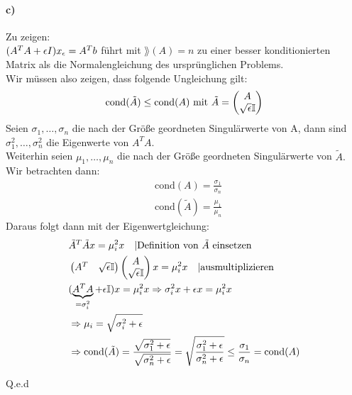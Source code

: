 \paragraph*{c)}
Zu zeigen:\\
$(A^TA + \epsilon I)x_\epsilon = A^Tb$ führt mit $\rang(A) = n$ zu einer besser konditionierten Matrix als die Normalengleichung des ursprünglichen Problems.\\
\newline
Wir müssen also zeigen, dass folgende Ungleichung gilt:
\begin{align*}
\text{cond}(\tilde{A})\le \text{cond}(A) \text{ mit } \tilde{A}=\begin{pmatrix}
A\\\sqrt{\epsilon}\mathbb{I}
\end{pmatrix}
\end{align*}
Seien $\sigma_1,\ldots,\sigma_n$ die nach der Größe geordneten Singulärwerte von A, dann sind  $\sigma_1^{2},\ldots,\sigma_n^{2}$ die Eigenwerte von $A^TA$.\\ Weiterhin seien $\mu_1,\ldots,\mu_n$ die nach der Größe geordneten Singulärwerte von $\tilde{A}.$
Wir betrachten dann:
\begin{align*}
&\text{cond}(A)=\frac{\sigma_1}{\sigma_n}\\
&\text{cond}(\tilde{A})=\frac{\mu_1}{\mu_n}
\end{align*}
Daraus folgt dann mit der Eigenwertgleichung:
\begin{align*}
&\tilde{A}^{T}\tilde{A}x=\mu_i^{2}x \quad |\text{Definition von $\tilde{A}$ einsetzen}\\
&\begin{pmatrix}
A^T&\sqrt{\epsilon}\mathbb{I}
\end{pmatrix}
\begin{pmatrix}
A\\\sqrt{\epsilon}\mathbb{I} 
\end{pmatrix}x=\mu_i^{2}x\quad |\text{ausmultiplizieren}\\
&(\underbrace{A^TA}_{=\sigma_i^{2}}+\epsilon\mathbb{I})x=\mu_i^2x \Rightarrow \sigma_i^{2}x+\epsilon x = \mu_i^{2}x\\
&\Rightarrow \mu_i=\sqrt{\sigma_i^{2}+\epsilon}\\
&\Rightarrow \text{cond}(\tilde{A})= \frac{\sqrt{\sigma_1^{2}+\epsilon}}{\sqrt{\sigma_n^{2}+\epsilon}}=\sqrt{\frac{\sigma_1^{2}+\epsilon}{\sigma_n^{2}+\epsilon}} \le \frac{\sigma_1}{\sigma_n}=\text{cond}(A)
\end{align*}
\begin{flushright}
	Q.e.d
\end{flushright}

